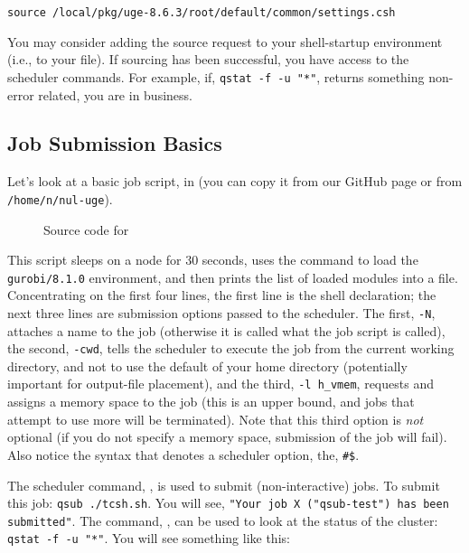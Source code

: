 \documentclass{easychair}
\begin{document}
\begin{verbatim}
source /local/pkg/uge-8.6.3/root/default/common/settings.csh 
\end{verbatim}

You may consider adding the source request to your shell-startup environment (i.e., to your  file). If sourcing has been successful, you have access to the scheduler commands. For example, if, \texttt{qstat -f -u "*"}, returns something non-error related, you are in business. 

\subsection{Job Submission Basics}

Let's look at a basic job script,  in 
(you can copy it from our GitHub page or from \texttt{/home/n/nul-uge}).

\begin{figure}[htpb]
    
    \caption{Source code for }
	\label{fig:tcsh.sh}
\end{figure}

This script sleeps on a node for 30 seconds, uses the  command to load the \texttt{gurobi/8.1.0} environment, and then prints the list of loaded modules into a file. Concentrating on the first four lines, the first line is the shell declaration; the next three lines are submission options passed to the scheduler. The first, \texttt{-N}, attaches a name to the job (otherwise it is called what the job script is called), the second, \texttt{-cwd}, tells the scheduler to execute the job from the current working directory, and not to use the default of your home directory (potentially important for output-file placement), and the third, \texttt{-l h\_vmem}, requests and assigns a memory space to the job (this is an upper bound, and jobs that attempt to use more will be terminated). Note that this third option 
is \emph{not} optional (if you do not specify a memory space, submission of the job will fail). Also notice the syntax that denotes a scheduler option, the, \verb+#$+. 

The scheduler command, , is used to submit (non-interactive) jobs. To submit this job: \texttt{qsub ./tcsh.sh}. You will see, \texttt{"Your job X ("qsub-test") has been submitted"}. The command, , can be used to look at the status of the cluster: \texttt{qstat -f -u "*"}. You will see something like this: 
\end{document}
